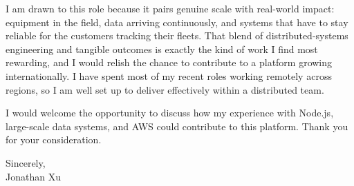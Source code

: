 \documentclass[11pt,a4paper]{article}
\begin{document}
I am drawn to this role because it pairs genuine scale with real-world impact: equipment in the field, data arriving continuously, and systems that have to stay reliable for the customers tracking their fleets. That blend of distributed-systems engineering and tangible outcomes is exactly the kind of work I find most rewarding, and I would relish the chance to contribute to a platform growing internationally. I have spent most of my recent roles working remotely across regions, so I am well set up to deliver effectively within a distributed team.

I would welcome the opportunity to discuss how my experience with Node.js, large-scale data systems, and AWS could contribute to this platform. Thank you for your consideration.

\vspace{0.5em}

Sincerely, \\
Jonathan Xu
\end{document}
